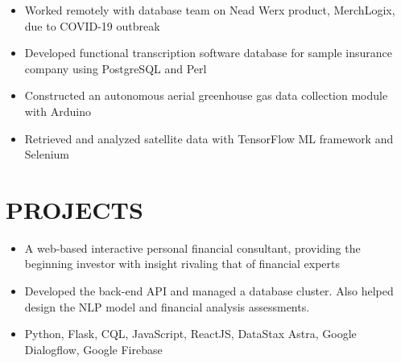 \documentclass[11pt,letterpaper]{article}
\begin{document}
  {\fontsize{12}{12}}
  
  \begin{itemize}
    \item{Worked remotely with database team on Nead Werx product, MerchLogix, due to COVID-19 outbreak}
    
    \item{Developed functional transcription software database for sample insurance company using PostgreSQL and Perl}
  \end{itemize}

  {\fontsize{12}{12}}

  \begin{itemize}
    \item{Constructed an autonomous aerial greenhouse gas data collection module with Arduino}
    
    \item{Retrieved and analyzed satellite data with TensorFlow ML framework and Selenium}
  \end{itemize}

  \bigskip

  
  \section*{PROJECTS}

  \iffizz
    {\fontsize{12}{12}}

    \begin{itemize}
      \item{A web-based interactive personal financial consultant, providing the beginning investor with insight rivaling that of financial experts}
      \item{Developed the back-end API and managed a database cluster. Also helped design the NLP model and financial analysis assessments.}
      \item{
        {}
        Python, Flask, CQL, JavaScript, ReactJS, DataStax Astra, Google Dialogflow, Google Firebase
      }
    \end{itemize}
  \fi
\end{document}
